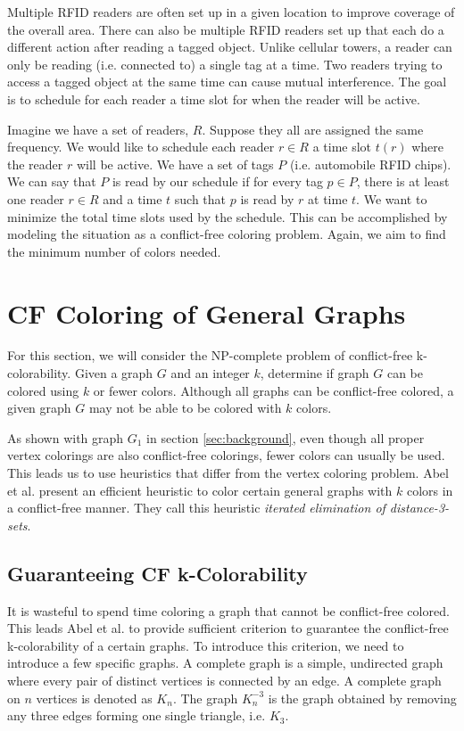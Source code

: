 \documentclass{sig-alternate}
\begin{document}
Multiple RFID readers are often set up in a given location to improve coverage of the overall area. There can also be multiple RFID readers set up that each do a different action after reading a tagged object. Unlike cellular towers, a reader can only be reading (i.e. connected to) a single tag at a time. Two readers trying to access a tagged object at the same time can cause mutual interference. The goal is to schedule for each reader a time slot for when the reader will be active.

Imagine we have a set of readers, $R$. Suppose they all are assigned the same frequency. We would like to schedule each reader $r \in R$ a time slot $t(r)$ where the reader $r$ will be active. We have a set of tags $P$ (i.e. automobile RFID chips). We can say that $P$ is read by our schedule if for every tag $p \in P$, there is at least one reader $r \in R$ and a time $t$ such that $p$ is read by $r$ at time $t$. We want to minimize the total time slots used by the schedule. This can be accomplished by modeling the situation as a conflict-free coloring problem. Again, we aim to find the minimum number of colors needed. \cite{cheilaris2014strong, smorodinsky2013conflict}

\section{CF Coloring of General Graphs}
\label{sec:general-coloring}
For this section, we will consider the NP-complete problem of conflict-free k-colorability. Given a graph $G$ and an integer $k$, determine if graph $G$ can be colored using $k$ or fewer colors. Although all graphs can be conflict-free colored, a given graph $G$ may not be able to be colored with $k$ colors.

As shown with graph $G_1$ in section \ref{sec:background}, even though all proper vertex colorings are also conflict-free colorings, fewer colors can usually be used. This leads us to use heuristics that differ from the vertex coloring problem. Abel et al. \cite{abel2017three} present an efficient heuristic to color certain general graphs with $k$ colors in a conflict-free manner. They call this heuristic \emph{iterated elimination of distance-3-sets}.

\subsection{Guaranteeing CF k-Colorability}
It is wasteful to spend time coloring a graph that cannot be conflict-free colored. This leads Abel et al. to provide sufficient criterion to guarantee the conflict-free k-colorability of a certain graphs. To introduce this criterion, we need to introduce a few specific graphs. A complete graph is a simple, undirected graph where every pair of distinct vertices is connected by an edge. A complete graph on $n$ vertices is denoted as $K_n$. The graph $K_n^{-3}$ is the graph obtained by removing any three edges forming one single triangle, i.e. $K_3$.
\end{document}

